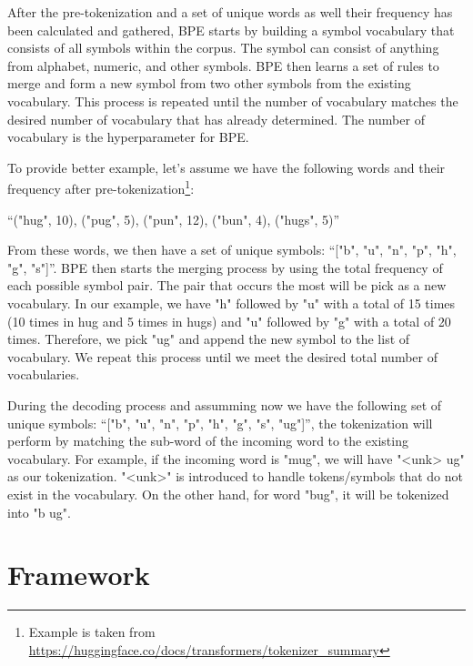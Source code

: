 After the pre-tokenization and a set of unique words as well their frequency has been calculated and gathered, BPE starts by building a symbol vocabulary that consists of all symbols within the corpus. The symbol can consist of anything from alphabet, numeric, and other symbols. BPE then learns a set of rules to merge and form a new symbol from two other symbols from the existing vocabulary. This process is repeated until the number of vocabulary matches the desired number of vocabulary that has already determined. The number of vocabulary is the hyperparameter for BPE.

To provide better example, let's assume we have the following words and their frequency after pre-tokenization\footnote{Example is taken from \url{https://huggingface.co/docs/transformers/tokenizer_summary}}:

\bigskip
``("hug", 10), ("pug", 5), ("pun", 12), ("bun", 4), ("hugs", 5)''
\bigskip

From these words, we then have a set of unique symbols: ``["b", "u", "n", "p", "h", "g", "s"]''. BPE then starts the merging process by using the total frequency of each possible symbol pair. The pair that occurs the most will be pick as a new vocabulary. In our example, we have "h" followed by "u" with a total of 15 times (10 times in hug and 5 times in hugs) and "u" followed by "g" with a total of 20 times. Therefore, we pick "ug" and append the new symbol to the list of vocabulary. We repeat this process until we meet the desired total number of vocabularies.

During the decoding process and assumming now we have the following set of unique symbols: ``["b", "u", "n", "p", "h", "g", "s", "ug"]'', the tokenization will perform by matching the sub-word of the incoming word to the existing vocabulary. For example, if the incoming word is "mug", we will have "<unk> ug" as our tokenization. "<unk>" is introduced to handle tokens/symbols that do not exist in the vocabulary. On the other hand, for word "bug", it will be tokenized into "b ug".


\section{Framework}
\label{sec:framework}
